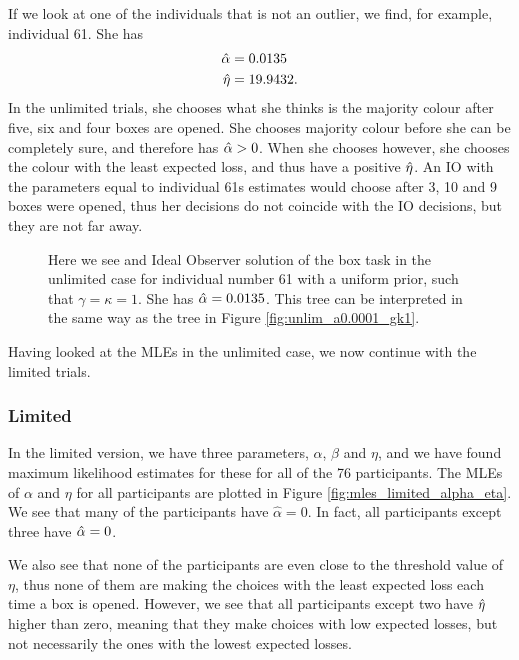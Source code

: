 If we look at one of the individuals that is not an outlier, we find, for example, individual 61. She has
\begin{equation}
\label{mles_unilim_person61}
    \begin{aligned}
        \hat{\alpha} &= 0.0135\\
        \hat{\eta} &= 19.9432.
    \end{aligned}
\end{equation}
In the unlimited trials, she chooses what she thinks is the majority colour after five, six and four boxes are opened. She chooses majority colour before she can be completely sure, and therefore has $\hat{\alpha}>0$. When she chooses however, she chooses the colour with the least expected loss, and thus have a positive $\hat{\eta}$. An IO with the parameters equal to individual 61s estimates would choose after 3, 10 and 9 boxes were opened, thus her decisions do not coincide with the IO decisions, but they are not far away.  
\begin{figure}
    \centering
    \scalebox{0.7}{}
    \caption[IO solution of individual number 61 with $\ha=0.0135$ and $\gamma=\kappa=1$]{Here we see and Ideal Observer solution of the box task in the unlimited case for individual number 61 with a uniform prior, such that $\gamma=\kappa=1$. She has $\ha=0.0135$. This tree can be interpreted in the same way as the tree in Figure \ref{fig:unlim_a0.0001_gk1}.}
    \label{fig:IO_sol_individual61}
\end{figure}

Having looked at the MLEs in the unlimited case, we now continue with the limited trials. 


\subsubsection{Limited}
In the limited version, we have three parameters, $\alpha$, $\beta$ and $\eta$, and we have found maximum likelihood estimates for these for all of the 76 participants. The MLEs of $\alpha$ and $\eta$ for all participants are plotted in Figure \ref{fig:mles_limited_alpha_eta}. We see that many of the participants have $\hat{\alpha}=0$. In fact, all participants except three have $\hat{\alpha}=0$. 

We also see that none of the participants are even close to the threshold value of $\eta$, thus none of them are making the choices with the least expected loss each time a box is opened. However, we see that all participants except two have $\hat{\eta}$ higher than zero, meaning that they make choices with low expected losses, but not necessarily the ones with the lowest expected losses.  

